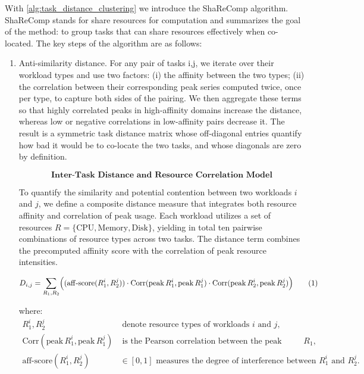 With \ref{alg:task_distance_clustering} we introduce the ShaReComp algorithm. ShaReComp stands for share resources for computation and summarizes the goal of the method: to group tasks that can share resources effectively when co-located.
The key steps of the algorithm are as follows:

\begin{enumerate}
    \item Anti-similarity distance. For any pair of tasks i,j, we iterate over their workload types and use two factors: (i) the affinity between the two types; (ii) the correlation between their corresponding peak series computed twice, once per type, to capture both sides of the pairing. We then aggregate these terms so that highly correlated peaks in high-affinity domains increase the distance, whereas low or negative correlations in low-affinity pairs decrease it. The result is a symmetric task distance matrix whose off-diagonal entries quantify how bad it would be to co-locate the two tasks, and whose diagonals are zero by definition.

          \[
              \textbf{Inter-Task Distance and Resource Correlation Model}
          \]

          To quantify the similarity and potential contention between two workloads
          \( i \) and \( j \), we define a composite distance measure
          that integrates both resource affinity and correlation of peak usage.
          Each workload utilizes a set of resources
          \( R = \{ \text{CPU}, \text{Memory}, \text{Disk}\} \),
          yielding in total ten pairwise combinations of resource types across two tasks.
          The distance term combines the precomputed affinity score with the
          correlation of peak resource intensities.

          \[
              D_{i,j}
              = \sum_{R_1, R_2}
              \Bigl(
              (\mathrm{aff\text{-}score}(R_1^i, R_2^j))
              \cdot
              \mathrm{Corr}(\mathrm{peak}\,R_1^i, \mathrm{peak}\,R_1^j)
              \cdot
              \mathrm{Corr}(\mathrm{peak}\,R_2^i, \mathrm{peak}\,R_2^j)
              \Bigr)
              \tag{1}
          \]

          where:
          \begin{align}
              R_1^i, R_2^j & \; \text{denote resource types of workloads } i \text{ and } j,                           \\[4pt]
              \mathrm{Corr}(\mathrm{peak}\,R_1^i, \mathrm{peak}\,R_1^j)
                           & \; \text{is the Pearson correlation between the peak usages of resource } R_1,            \\[4pt]
              \mathrm{aff\text{-}score}(R_1^i, R_2^j)
                           & \in [0, 1] \text{ measures the degree of interference between } R_1^i \text{ and } R_2^j.
          \end{align}


\end{enumerate}
